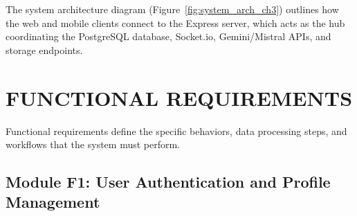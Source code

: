 \documentclass[12,Times new Roman,a4paper]{report}
\begin{document}
The system architecture diagram (Figure~\ref{fig:system_arch_ch3}) outlines how the web and mobile clients connect to the Express server, which acts as the hub coordinating the PostgreSQL database, Socket.io, Gemini/Mistral APIs, and storage endpoints.

\section{FUNCTIONAL REQUIREMENTS}
Functional requirements define the specific behaviors, data processing steps, and workflows that the system must perform.

\subsection{Module F1: User Authentication and Profile Management}
\end{document}
